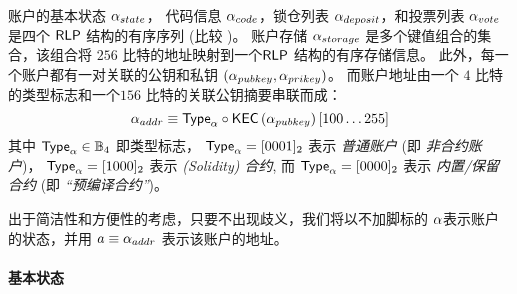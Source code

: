 账户的基本状态 $\mathbf{\alpha}_{state}$， 代码信息 $\mathbf{\alpha}_{code}$，锁仓列表 $\mathbf{\alpha}_{deposit}$，和投票列表 $\mathbf{\alpha}_{vote}$ 是四个 $\mathsf{RLP}$ 结构的有序序列 (比较 \cite{ETH_yellow})。
账户存储 $\mathbf{\alpha}_{storage}$ 是多个键值组合的集合，该组合将 $256$ 比特的地址映射到一个$\mathsf{RLP}$ 结构的有序存储信息。
此外，每一个账户都有一对关联的公钥和私钥 $\left(\mathbf{\alpha}_{pubkey}, \mathbf{\alpha}_{prikey}\right)$。
而账户地址由一个 $4$ 比特的类型标志和一个$156$ 比特的关联公钥摘要串联而成：
\begin{equation}\label{eq:account-address}
	\mathbf{\alpha}_{addr} \equiv \mathsf{Type}_{\mathbf{\alpha}} \circ \mathsf{KEC} \left( \mathbf{\alpha}_{pubkey} \right)[100\dots 255]
\end{equation}
其中 $\mathsf{Type}_{\mathbf{\alpha}}\in \mathbb{B}_4$ 即类型标志，
$\mathsf{Type}_{\mathbf{\alpha}}=[0001]_2$ 表示 \emph{普通账户} (即 \emph{非合约账户})，
$\mathsf{Type}_{\mathbf{\alpha}}=[1000]_2$ 表示 \emph{(Solidity) 合约},
而 $\mathsf{Type}_{\mathbf{\alpha}}=[0000]_2$ 表示 \emph{内置/保留合约} (即 \emph{``预编译合约''})。


出于简洁性和方便性的考虑，只要不出现歧义，我们将以不加脚标的 $\mathbf{\alpha}$表示账户的状态，并用 $a\equiv \mathbf{\alpha}_{addr}$ 表示该账户的地址。


\paragraph{基本状态}

